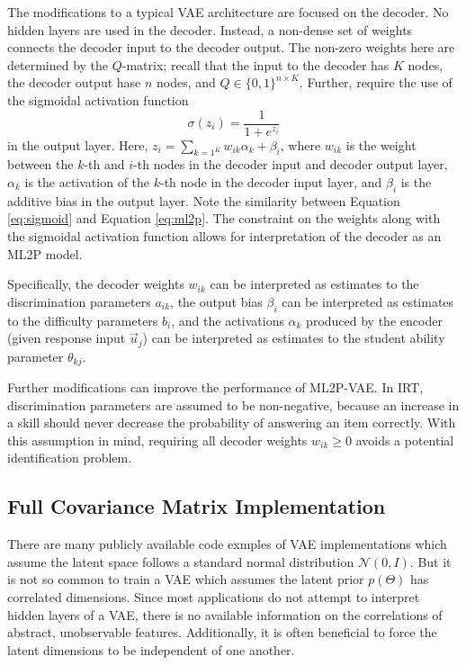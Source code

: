 The modifications to a typical VAE architecture are focused on the decoder. No hidden layers are used in the decoder. Instead, a non-dense set of weights connects the decoder input to the decoder output. The non-zero weights here are determined by the $Q$-matrix; recall that the input to the decoder has $K$ nodes, the decoder output hase $n$ nodes, and $Q \in \{0,1\}^{n \times K}$. Further, require the use of the sigmoidal activation function
\begin{equation}
  \sigma(z_i) = \frac{1}{1 + e^{z_i}}
  \label{eq:sigmoid}
\end{equation}
in the output layer. Here, $z_i = \sum_{k=1^K} w_{ik}\alpha_{k} + \beta_i$, where $w_{ik}$ is the weight between the $k$-th and $i$-th nodes in the decoder input and decoder output layer, $\alpha_k$ is the activation of the $k$-th node in the decoder input layer, and $\beta_i$ is the additive bias in the output layer. Note the similarity between Equation \ref{eq:sigmoid} and Equation \ref{eq:ml2p}. The constraint on the weights along with the sigmoidal activation function allows for interpretation of the decoder as an ML2P model.

Specifically, the decoder weights $w_{ik}$ can be interpreted as estimates to the discrimination parameters $a_{ik}$, the output bias $\beta_i$ can be interpreted as estimates to the difficulty parameters $b_i$, and the activations $\alpha_k$ produced by the encoder (given response input $\vec u_j$) can be interpreted as estimates to the student ability parameter $\theta_{kj}$. 

Further modifications can improve the performance of ML2P-VAE. In IRT, discrimination parameters are assumed to be non-negative, because an increase in a skill should never decrease the probability of answering an item correctly. With this assumption in mind, requiring all decoder weights $w_{ik} \geq 0$ avoids a potential identification problem. 

\subsection{Full Covariance Matrix Implementation}\label{sec:cov}
There are many publicly available code exmples of VAE implementations which assume the latent space follows a standard normal distribution $\mathcal{N}(0,I)$. But it is not so common to train a VAE which assumes the latent prior $p(\Theta)$ has correlated dimensions. Since most applications do not attempt to interpret hidden layers of a VAE, there is no available information on the correlations of abstract, unobservable features. Additionally, it is often beneficial to force the latent dimensions to be independent of one another.

